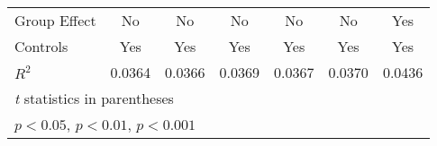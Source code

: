 {\begin{tabular}{l*{6}{c}}
Group Effect    &       No         &       No         &       No         &       No         &       No         &      Yes         \\
Controls        &      Yes         &      Yes         &      Yes         &      Yes         &      Yes         &      Yes         \\
$ R^2 $         &   0.0364         &   0.0366         &   0.0369         &   0.0367         &   0.0370         &   0.0436         \\
\hline\hline
\multicolumn{7}{l}{\footnotesize \textit{t} statistics in parentheses}\\
\multicolumn{7}{l}{\footnotesize \sym{*} \(p<0.05\), \sym{**} \(p<0.01\), \sym{***} \(p<0.001\)}\\
\end{tabular}
}
